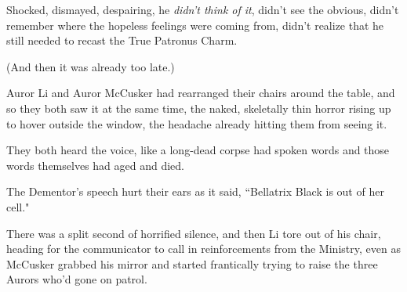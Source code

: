 Shocked, dismayed, despairing, he \emph{didn't think of it}, didn't see the obvious, didn't remember where the hopeless feelings were coming from, didn't realize that he still needed to recast the True Patronus Charm.

(And then it was already too late.)

\later

Auror Li and Auror McCusker had rearranged their chairs around the table, and so they both saw it at the same time, the naked, skeletally thin horror rising up to hover outside the window, the headache already hitting them from seeing it.

They both heard the voice, like a long-dead corpse had spoken words and those words themselves had aged and died.

The Dementor's speech hurt their ears as it said, ``Bellatrix Black is out of her cell."

There was a split second of horrified silence, and then Li tore out of his chair, heading for the communicator to call in reinforcements from the Ministry, even as McCusker grabbed his mirror and started frantically trying to raise the three Aurors who'd gone on patrol.

